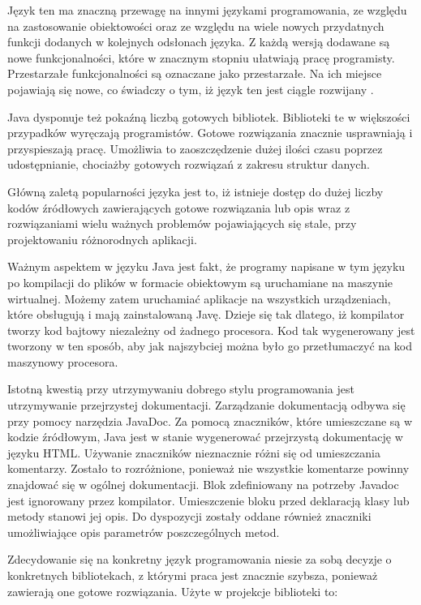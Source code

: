 Język ten ma znaczną przewagę na innymi językami programowania,  ze względu na zastosowanie obiektowości oraz ze względu na wiele nowych przydatnych funkcji dodanych w kolejnych odsłonach języka. Z każdą wersją dodawane są nowe funkcjonalności, które w znacznym stopniu ułatwiają pracę programisty. Przestarzałe funkcjonalności są oznaczane jako przestarzałe. Na ich miejsce pojawiają się nowe, co świadczy o tym, iż język ten jest ciągle rozwijany \cite{horstmann}. 


Java dysponuje też pokaźną liczbą gotowych bibliotek. Biblioteki te w większości przypadków wyręczają programistów. Gotowe rozwiązania znacznie usprawniają i przyspieszają pracę. Umożliwia to zaoszczędzenie dużej ilości czasu poprzez udostępnianie, chociażby gotowych rozwiązań z zakresu struktur danych.


Główną zaletą popularności języka jest to, iż istnieje dostęp do dużej liczby kodów źródłowych zawierających gotowe rozwiązania lub opis wraz z rozwiązaniami wielu ważnych problemów pojawiających się stale, przy projektowaniu różnorodnych aplikacji.


Ważnym aspektem w języku Java \cite{horstmann2} jest fakt, że programy napisane w tym języku  po kompilacji do plików w formacie obiektowym są uruchamiane na maszynie wirtualnej. Możemy zatem uruchamiać aplikacje na wszystkich urządzeniach, które obsługują i mają zainstalowaną Javę. Dzieje się tak dlatego, iż kompilator tworzy kod bajtowy niezależny od żadnego procesora. Kod tak wygenerowany jest tworzony w ten sposób, aby jak najszybciej można było go przetłumaczyć na kod maszynowy procesora.


Istotną kwestią przy utrzymywaniu dobrego stylu programowania jest utrzymywanie przejrzystej dokumentacji. Zarządzanie dokumentacją odbywa się przy pomocy narzędzia JavaDoc. Za pomocą znaczników, które umieszczane są w kodzie źródłowym, Java jest w stanie wygenerować przejrzystą dokumentację w języku HTML. Używanie znaczników nieznacznie różni się od umieszczania komentarzy. Zostało to rozróżnione, ponieważ nie wszystkie komentarze powinny znajdować się w ogólnej dokumentacji. Blok zdefiniowany na potrzeby Javadoc jest ignorowany przez kompilator. Umieszczenie bloku przed deklaracją klasy lub metody stanowi jej opis. Do dyspozycji zostały oddane również znaczniki umożliwiające opis parametrów poszczególnych metod. 


Zdecydowanie się na konkretny język programowania niesie za sobą decyzje o konkretnych bibliotekach, z którymi praca jest znacznie szybsza, ponieważ zawierają one gotowe rozwiązania. Użyte w projekcje biblioteki to:



